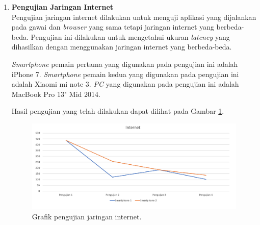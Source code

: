 \begin{enumerate}
%		
%		
%		
%
	
	
	\item \textbf{Pengujian Jaringan Internet} \\
	Pengujian jaringan internet dilakukan untuk menguji aplikasi yang dijalankan pada gawai dan \textit{browser} yang sama tetapi jaringan internet yang berbeda-beda. Pengujian ini dilakukan untuk mengetahui ukuran \textit{latency} yang dihasilkan dengan menggunakan jaringan internet yang berbeda-beda. 
	
	\textit{Smartphone} pemain pertama yang digunakan pada pengujian ini adalah iPhone 7. \textit{Smartphone} pemain kedua yang digunakan pada pengujian ini adalah Xiaomi mi note 3. \textit{PC} yang digunakan pada pengujian ini adalah MacBook Pro 13" Mid 2014.
	
	Hasil pengujian yang telah dilakukan dapat dilihat pada Gambar \ref{fig:pengujian_internet}.
	
	\begin{figure}[H]
		\centering
		\includegraphics[scale=0.4]{Gambar/pengujian_internet}
		\caption{Grafik pengujian jaringan internet.}
		\label{fig:pengujian_internet}
	\end{figure}


\end{enumerate}
